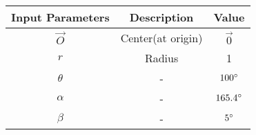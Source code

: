    \begin{tabular}{|c|c|c|}
    \hline
    \textbf{Input Parameters} &\textbf{Description} &\textbf{Value} \\
    \hline
     $\vec{O}$& Center(at origin)&$\vec{0}$\\
     \hline
 $r$ & Radius &1\\
 \hline
 $\theta$&-&$100\degree$\\
 \hline
 $\alpha$&-&$165.4\degree$\\
 \hline
 $\beta$&-&$5\degree$\\
 \hline
  \end{tabular}
